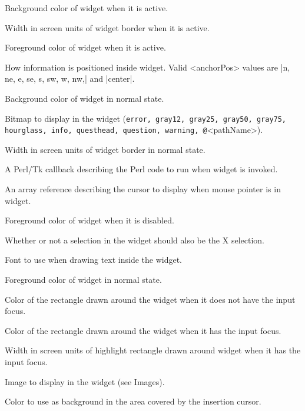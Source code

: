\begin{enum}{1cm}

Background color of widget when it is active.

Width in screen units of widget border when it is active.

Foreground color of widget when it is active.

How information is positioned inside widget. Valid
<anchorPos> values are |n, ne, e, se, s, sw, w, nw,| and |center|.

Background color of widget in normal state.

Bitmap to display in the widget ({\tt error, gray12, gray25, gray50,
gray75, hourglass, info, questhead, question, warning, @}<pathName>).

Width in screen units of widget border in normal state.

A Perl/Tk callback describing the Perl code to run when widget is invoked.

An array reference describing the cursor to display when mouse pointer is in widget.

Foreground color of widget when it is disabled.

Whether or not a selection in the widget should also 
be the X selection.

Font to use when drawing text inside the widget.

Foreground color of widget in normal state.

Color of the rectangle drawn around the widget when it does not
have the input focus.

Color of the rectangle drawn around the widget when it has the
input focus.

Width in screen units of highlight rectangle drawn around widget 
when it has the input focus.

Image to display in the widget (see Images).

Color to use as background in the area covered by the insertion
cursor.


\end{enum}
